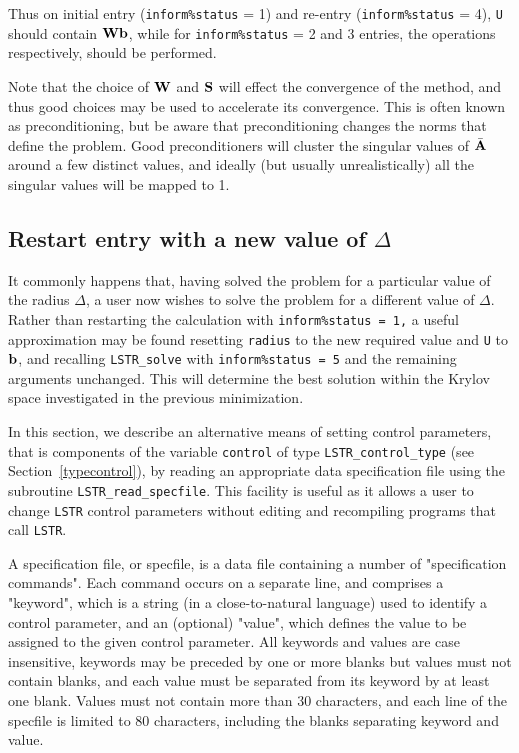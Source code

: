 \documentclass{galahad}
\newcommand{\packagename}{LS\-TR}
\begin{document}
Thus on initial entry ({\tt inform\%status} = 1) and re-entry
({\tt inform\%status} = 4), {\tt U} should contain ${\mathbf{W}} {\mathbf{b}}$,
while for {\tt inform\%status} = 2 and 3 entries, the operations
respectively, should be performed.

Note that the choice of ${\mathbf{W}}$ and ${\mathbf{S}}$ will effect the convergence of the
method, and thus good choices may be used to accelerate its convergence. This
is often known as preconditioning, but be aware that preconditioning changes
the norms that define the problem. Good preconditioners will cluster 
the singular values of $\bar{{\mathbf{A}}}$ around a few distinct values, and ideally
(but usually unrealistically) all the singular values will be mapped to 1.


\subsection{Restart entry with a new value of $\Delta$}
It commonly happens that, having solved the problem for a particular value 
of the radius $\Delta$, a user now wishes to solve the problem for a different  
value of $\Delta$. Rather than restarting the calculation with  
{\tt inform\%status = 1,} a useful approximation may be found 
resetting {\tt radius} to the new required value and {\tt U} to ${\mathbf{b}}$,
and recalling {\tt \packagename\_solve}  
with {\tt inform\%status = 5} and the remaining arguments unchanged. 
This will determine the best solution within the Krylov space investigated 
in the previous minimization.


\galfeatures
\noindent In this section, we describe an alternative means of setting 
control parameters, that is components of the variable {\tt control} of type
{\tt \packagename\_control\_type}
(see Section~\ref{typecontrol}), 
by reading an appropriate data specification file using the
subroutine {\tt \packagename\_read\_specfile}. This facility
is useful as it allows a user to change  {\tt \packagename} control parameters 
without editing and recompiling programs that call {\tt \packagename}.

A specification file, or specfile, is a data file containing a number of 
"specification commands". Each command occurs on a separate line, 
and comprises a "keyword", 
which is a string (in a close-to-natural language) used to identify a 
control parameter, and 
an (optional) "value", which defines the value to be assigned to the given
control parameter. All keywords and values are case insensitive, 
keywords may be preceded by one or more blanks but
values must not contain blanks, and
each value must be separated from its keyword by at least one blank.
Values must not contain more than 30 characters, and 
each line of the specfile is limited to 80 characters,
including the blanks separating keyword and value.
\end{document}
